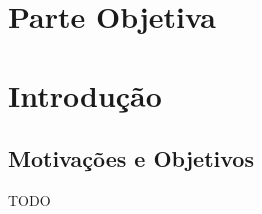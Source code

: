 \chapter*{Parte Objetiva}
\label{sec:parte_objetiva}
\chapter{Introdução}
\label{sec:intr}

\section{Motivações e Objetivos}
\label{sec:intr:motivacoes_objetivos}

TODO